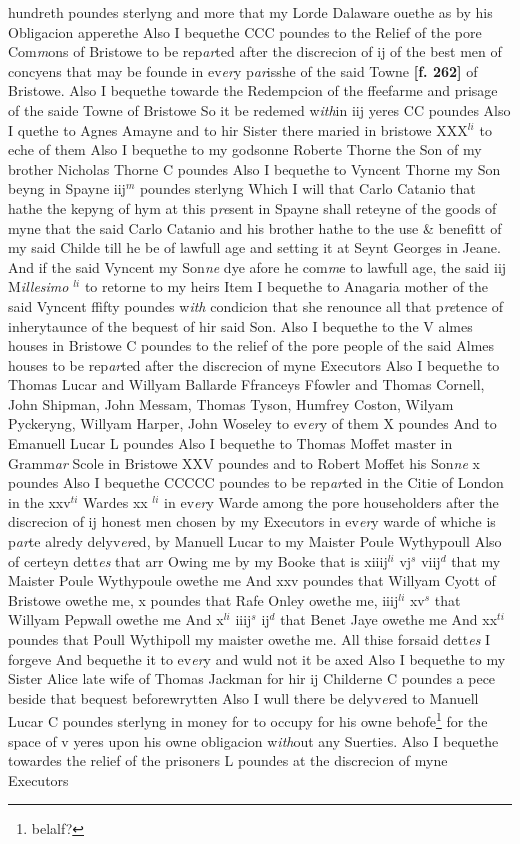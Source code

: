 \documentclass[a4paper,12pt]{article}
\begin{document}
hundreth poundes sterlyng and more that my Lorde Dalaware ouethe as by his Obligacion apperethe Also I bequethe CCC poundes to the Relief of the pore Com\textit{m}ons of Bristowe to be rep\textit{ar}ted after the discrecion of ij of the best men of concyens that may be founde in ev\textit{er}y p\textit{ar}isshe of the said Towne \textbf{[f. 262]} of Bristowe. Also I bequethe towarde the Redempcion of the ffeefarme and prisage of the saide Towne of Bristowe So it be redemed w\textit{ith}in iij yeres CC poundes Also I quethe to Agnes Amayne and to hir Sister there maried in bristowe XXX$^{li}$ to eche of them Also I bequethe to my godsonne Roberte Thorne the Son of my brother Nicholas Thorne C poundes Also I bequethe to Vyncent Thorne my Son beyng in Spayne iij$^{m}$ poundes sterlyng Which I will that Carlo Catanio that hathe the kepyng of hym at this p\textit{re}sent in Spayne shall reteyne of the goods of myne that the said Carlo Catanio and his brother hathe to the use \& benefitt of my said Childe till he be of lawfull age and setting it at Seynt Georges in Jeane. And if the said Vyncent my Son\textit{ne} dye afore he com\textit{m}e to lawfull age, the said iij M\textit{illesimo} $^{li}$ to retorne to my heirs Item I bequethe to Anagaria mother of the said Vyncent ffifty poundes w\textit{ith} condicion that she renounce all that p\textit{re}tence of inherytaunce of the bequest of hir said Son. Also I bequethe to the V almes houses in Bristowe C poundes to the relief of the pore people of the said Almes houses to be rep\textit{ar}ted after the discrecion of myne Executors Also I bequethe to Thomas Lucar and Willyam Ballarde Ffranceys Ffowler and Thomas Cornell, John Shipman, John Messam, Thomas Tyson, Humfrey Coston, Wilyam Pyckeryng, Willyam Harper, John Woseley to ev\textit{er}y of them X poundes And to Emanuell Lucar L poundes Also I bequethe to Thomas Moffet master in Gramm\textit{ar} Scole in Bristowe XXV poundes and to Robert Moffet his Son\textit{ne} x poundes Also I bequethe CCCCC poundes to be rep\textit{ar}ted in the Citie of London in the xxv$^{ti}$ Wardes xx $^{li}$ in ev\textit{er}y Warde among the pore householders after the discrecion of ij honest men chosen by my Executors in ev\textit{er}y warde of whiche is p\textit{ar}te alredy delyv\textit{er}ed, by Manuell Lucar to my Maister Poule Wythypoull Also of certeyn dett\textit{es} that arr Owing me by my Booke that is xiiij$^{li}$ vj$^{s}$ viij$^{d}$ that my Maister Poule Wythypoule owethe me And xxv poundes that Willyam Cyott of Bristowe owethe me, x poundes that Rafe Onley owethe me, iiij$^{li}$ xv$^{s}$ that Willyam Pepwall owethe me And x$^{li}$ iiij$^{s}$ ij$^{d}$ that Benet Jaye owethe me And xx$^{ti}$ poundes that Poull Wythipoll my maister owethe me. All thise forsaid dett\textit{es} I forgeve And bequethe it to ev\textit{er}y and wuld not it be axed Also I bequethe to my Sister Alice late wife of Thomas Jackman for hir ij Childerne C poundes a pece beside that bequest beforewrytten Also I wull there be delyv\textit{er}ed to Manuell Lucar C poundes sterlyng in money for to occupy for his owne behofe\footnote{belalf?} for the space of v yeres upon his owne obligacion w\textit{ith}out any Suerties. Also I bequethe towardes the relief of the prisoners L poundes at the discrecion of myne Executors 
\end{document}
